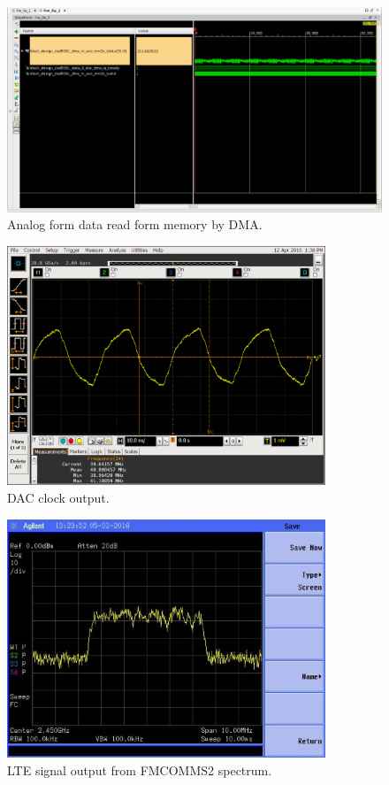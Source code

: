\begin{figure}[htbp]
    \centering
    \includegraphics[width=1\textwidth,
    trim={{.11\textwidth} {.95\textwidth} {.04\textwidth} {.15\textwidth}},
    clip]{./figures/ltedac_ila}
    \caption{ Analog form data read form memory by DMA.
    \label{fig:dataflowana}}
\end{figure}

\begin{figure}[htbp]
    \centering
    \includegraphics[width=0.85\textwidth]{./figures/oscill_ad9361_dac_clk}
    \caption{ DAC clock output.
    \label{fig:dacclk}}
\end{figure}

\begin{figure}[htbp]
    \centering
    \includegraphics[width=0.85\textwidth]{./figures/lte_5m}
    \caption{ LTE signal output from FMCOMMS2 spectrum.
    \label{fig:lte5m}}
\end{figure}

